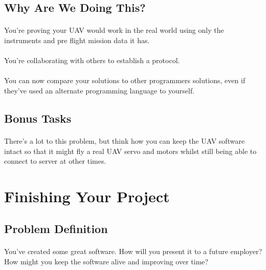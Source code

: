 \documentclass[11pt]{book}
\begin{document}
\subsection{Why Are We Doing This?}

\paragraph{} You're proving your UAV would work in the real world using only
the instruments and pre flight mission data it has.
 
\paragraph{} You're collaborating with others to establish a protocol.

\paragraph{} You can now compare your solutions to other programmers
solutions, even if they've used an alternate programming language to yourself.

\subsection{Bonus Tasks}

\paragraph{} There's a lot to this problem, but think how you can keep the UAV
software intact so that it might fly a real UAV servo and motors whilst still
being able to connect to server at other times.

\clearpage

\section{Finishing Your Project}

\subsection{Problem Definition}

\paragraph{} You've created some great software. How will you present it to a
future employer? How might you keep the software alive and improving over
time?
\end{document}
